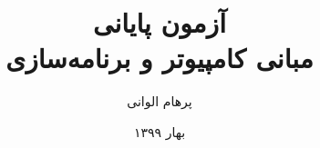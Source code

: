 \documentclass[]{article}
\title{آزمون پایانی\\مبانی کامپیوتر و برنامه‌سازی}
\author{پرهام الوانی}
\date{بهار ۱۳۹۹}
\begin{document}
    \maketitle

    
    \pagebreak
    
    \pagebreak
    
    \pagebreak
    
    \pagebreak
    
\end{document}
